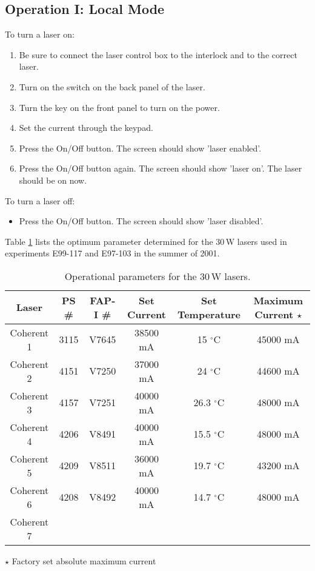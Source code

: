 {\subsection{Operation I: Local Mode}
To turn a laser on:
\begin{enumerate} \setlength{\parskip}{0ex}
\item Be sure to connect the laser control box to the interlock and to
the correct laser.
\item Turn on the switch on the back panel of the laser.
\item Turn the key on the front panel to turn on the power.
\item Set the current through the keypad.
\item Press the On/Off button.  The screen should show 'laser enabled'.
\item Press the On/Off button again.  The screen should show 'laser on'. The 
      laser should be on now.
\end{enumerate}
To turn a laser off:
\begin{itemize}
\item Press the On/Off button.  The screen should show 'laser disabled'.
\end{itemize}

Table \ref{tab:laserparam} lists the optimum parameter
determined for the 30\,W lasers used in experiments E99-117 and E97-103
in the summer of 2001.

\begin{table}[hbp]
\begin{center}
\begin{tabular}{|c|c|c|c|c|c|}\hline

 Laser        & PS \#  &  FAP-I \#  &  Set Current & Set Temperature & Maximum Current $\star$\\ \hline
 Coherent 1   & 3115   &  V7645     & 38500 mA  &   15 $^\circ$C     &  45000 mA\\ \hline
 Coherent 2   & 4151   &  V7250     & 37000 mA  &   24 $^\circ$C     & 44600 mA    \\ \hline
 Coherent 3   & 4157   &  V7251     & 40000 mA  &   26.3 $^\circ$C   & 48000 mA    \\ \hline
 Coherent 4   & 4206   &  V8491     & 40000 mA  &   15.5 $^\circ$C   & 48000 mA    \\ \hline
 Coherent 5   & 4209   &  V8511     & 36000 mA  &   19.7 $^\circ$C   & 43200 mA    \\ \hline
 Coherent 6   & 4208   &  V8492     & 40000 mA  &   14.7 $^\circ$C   & 48000 mA    \\ \hline
 Coherent 7  && & &  &       \\ \hline
\end{tabular}
 $\star$ Factory set absolute maximum current 
\end{center}
\caption{Operational parameters for the 30\,W lasers.}
\label{tab:laserparam}
\end{table}



}
